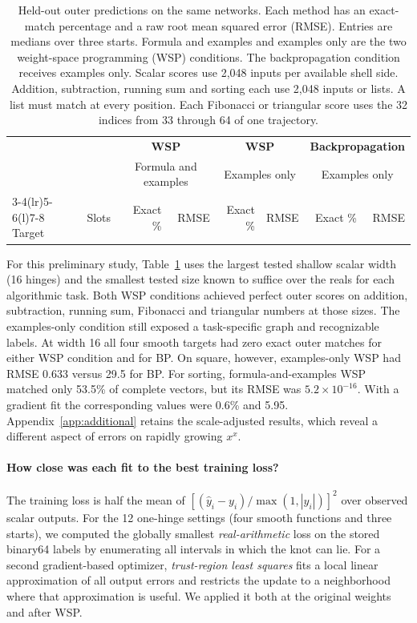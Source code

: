 \begin{table}[htbp]\centering\small\setlength{\tabcolsep}{3.5pt}
\caption{Held-out outer predictions on the same networks. Each method has an exact-match percentage and a raw root mean squared error (RMSE). Entries are medians over three starts. Formula and examples and examples only are the two weight-space programming (WSP) conditions. The backpropagation condition receives examples only. Scalar scores use 2,048 inputs per available shell side. Addition, subtraction, running sum and sorting each use 2,048 inputs or lists. A list must match at every position. Each Fibonacci or triangular score uses the 32 indices from 33 through 64 of one trajectory.}\label{tab:paired}
\begin{tabular}{@{}lr rr rr rr@{}}\toprule
&&\multicolumn{2}{c}{\textbf{WSP}}&\multicolumn{2}{c}{\textbf{WSP}}&\multicolumn{2}{c}{\textbf{Backpropagation}}\\
&&\multicolumn{2}{c}{Formula and examples}&\multicolumn{2}{c}{Examples only}&\multicolumn{2}{c}{Examples only}\\
\cmidrule(lr){3-4}\cmidrule(lr){5-6}\cmidrule(l){7-8}
Target & Slots & Exact \% & RMSE & Exact \% & RMSE & Exact \% & RMSE\\\midrule
\end{tabular}
\end{table}

For this preliminary study, Table~\ref{tab:paired} uses the largest tested shallow scalar width (16 hinges) and the smallest tested size known to suffice over the reals for each algorithmic task. Both WSP conditions achieved perfect outer scores on addition, subtraction, running sum, Fibonacci and triangular numbers at those sizes. The examples-only condition still exposed a task-specific graph and recognizable labels. At width 16 all four smooth targets had zero exact outer matches for either WSP condition and for BP. On square, however, examples-only WSP had RMSE 0.633 versus 29.5 for BP. For sorting, formula-and-examples WSP matched only 53.5\% of complete vectors, but its RMSE was $5.2\times10^{-16}$. With a gradient fit the corresponding values were 0.6\% and 5.95. Appendix~\ref{app:additional} retains the scale-adjusted results, which reveal a different aspect of errors on rapidly growing $x^x$.

\paragraph{How close was each fit to the best training loss?}
The training loss is half the mean of $[(\hat y_i-y_i)/\max(1,|y_i|)]^2$ over observed scalar outputs. For the 12 one-hinge settings (four smooth functions and three starts), we computed the globally smallest \emph{real-arithmetic} loss on the stored binary64 labels by enumerating all intervals in which the knot can lie. For a second gradient-based optimizer, \emph{trust-region least squares} fits a local linear approximation of all output errors and restricts the update to a neighborhood where that approximation is useful. We applied it both at the original weights and after WSP.

